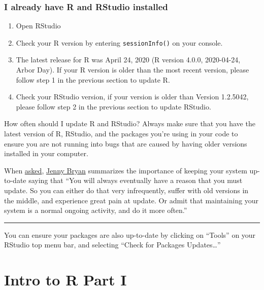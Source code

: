 \documentclass[]{book}
\providecommand{\tightlist}{%
  \setlength{\itemsep}{0pt}\setlength{\parskip}{0pt}}
\begin{document}
\hypertarget{i-already-have-r-and-rstudio-installed}{%
\subsection{I already have R and RStudio installed}\label{i-already-have-r-and-rstudio-installed}}

\begin{enumerate}
\def\labelenumi{\arabic{enumi}.}
\tightlist
\item
  Open RStudio
\item
  Check your R version by entering \texttt{sessionInfo()} on your console.
\item
  The latest release for R was April 24, 2020 (R version 4.0.0, 2020-04-24, Arbor Day). If your R version is older than the most recent version, please follow step 1 in the previous section to update R.
\item
  Check your RStudio version, if your version is older than Version 1.2.5042, please follow step 2 in the previous section to update RStudio.
\end{enumerate}

\leavevmode\hypertarget{explanation}{}%
How often should I update R and RStudio? Always make sure that you have the latest version of R, RStudio, and the packages you're using in your code to ensure you are not running into bugs that are caused by having older versions installed in your computer.

When \href{https://community.rstudio.com/t/should-i-update-all-my-r-packages-frequently-yes-no-why/5856/4}{asked}, \href{https://community.rstudio.com/u/jennybryan}{Jenny Bryan} summarizes the importance of keeping your system up-to-date saying that ``You will always eventually have a reason that you must update. So you can either do that very infrequently, suffer with old versions in the middle, and experience great pain at update. Or admit that maintaining your system is a normal ongoing activity, and do it more often.''

\begin{center}\rule{0.5\linewidth}{0.5pt}\end{center}

You can ensure your packages are also up-to-date by clicking on ``Tools'' on your RStudio top menu bar, and selecting ``Check for Packages Updates\ldots{}''

\hypertarget{parti}{%
\chapter{Intro to R Part I}\label{parti}}
\end{document}
